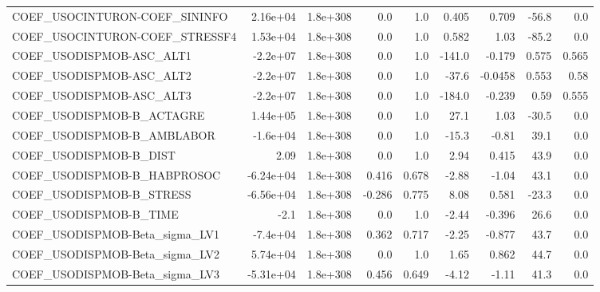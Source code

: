 \begin{tabular}{lrrrrrrrr}
COEF\_USOCINTURON-COEF\_SININFO     &    2.16e+04 &     1.8e+308 &      0.0 &      1.0 &      0.405 &       0.709 &        -56.8 &           0.0 \\
COEF\_USOCINTURON-COEF\_STRESSF4    &    1.53e+04 &     1.8e+308 &      0.0 &      1.0 &      0.582 &        1.03 &        -85.2 &           0.0 \\
COEF\_USODISPMOB-ASC\_ALT1          &    -2.2e+07 &     1.8e+308 &      0.0 &      1.0 &     -141.0 &      -0.179 &        0.575 &         0.565 \\
COEF\_USODISPMOB-ASC\_ALT2          &    -2.2e+07 &     1.8e+308 &      0.0 &      1.0 &      -37.6 &     -0.0458 &        0.553 &          0.58 \\
COEF\_USODISPMOB-ASC\_ALT3          &    -2.2e+07 &     1.8e+308 &      0.0 &      1.0 &     -184.0 &      -0.239 &         0.59 &         0.555 \\
COEF\_USODISPMOB-B\_ACTAGRE         &    1.44e+05 &     1.8e+308 &      0.0 &      1.0 &       27.1 &        1.03 &        -30.5 &           0.0 \\
COEF\_USODISPMOB-B\_AMBLABOR        &    -1.6e+04 &     1.8e+308 &      0.0 &      1.0 &      -15.3 &       -0.81 &         39.1 &           0.0 \\
COEF\_USODISPMOB-B\_DIST            &        2.09 &     1.8e+308 &      0.0 &      1.0 &       2.94 &       0.415 &         43.9 &           0.0 \\
COEF\_USODISPMOB-B\_HABPROSOC       &   -6.24e+04 &     1.8e+308 &    0.416 &    0.678 &      -2.88 &       -1.04 &         43.1 &           0.0 \\
COEF\_USODISPMOB-B\_STRESS          &   -6.56e+04 &     1.8e+308 &   -0.286 &    0.775 &       8.08 &       0.581 &        -23.3 &           0.0 \\
COEF\_USODISPMOB-B\_TIME            &        -2.1 &     1.8e+308 &      0.0 &      1.0 &      -2.44 &      -0.396 &         26.6 &           0.0 \\
COEF\_USODISPMOB-Beta\_sigma\_LV1    &    -7.4e+04 &     1.8e+308 &    0.362 &    0.717 &      -2.25 &      -0.877 &         43.7 &           0.0 \\
COEF\_USODISPMOB-Beta\_sigma\_LV2    &    5.74e+04 &     1.8e+308 &      0.0 &      1.0 &       1.65 &       0.862 &         44.7 &           0.0 \\
COEF\_USODISPMOB-Beta\_sigma\_LV3    &   -5.31e+04 &     1.8e+308 &    0.456 &    0.649 &      -4.12 &       -1.11 &         41.3 &           0.0 \\

\end{tabular}
